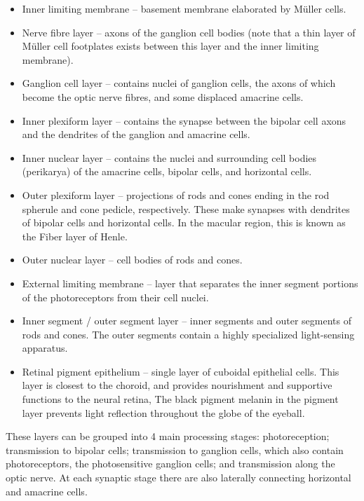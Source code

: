 \documentclass[]{book}
\providecommand{\tightlist}{%
  \setlength{\itemsep}{0pt}\setlength{\parskip}{0pt}}
\begin{document}
\begin{itemize}
\tightlist
\item
  Inner limiting membrane -- basement membrane elaborated by Müller cells.
\item
  Nerve fibre layer -- axons of the ganglion cell bodies (note that a thin layer of Müller cell footplates exists between this layer and the inner limiting membrane).
\item
  Ganglion cell layer -- contains nuclei of ganglion cells, the axons of which become the optic nerve fibres, and some displaced amacrine cells.
\item
  Inner plexiform layer -- contains the synapse between the bipolar cell axons and the dendrites of the ganglion and amacrine cells.
\item
  Inner nuclear layer -- contains the nuclei and surrounding cell bodies (perikarya) of the amacrine cells, bipolar cells, and horizontal cells.
\item
  Outer plexiform layer -- projections of rods and cones ending in the rod spherule and cone pedicle, respectively. These make synapses with dendrites of bipolar cells and horizontal cells. In the macular region, this is known as the Fiber layer of Henle.
\item
  Outer nuclear layer -- cell bodies of rods and cones.
\item
  External limiting membrane -- layer that separates the inner segment portions of the photoreceptors from their cell nuclei.
\item
  Inner segment / outer segment layer -- inner segments and outer segments of rods and cones. The outer segments contain a highly specialized light-sensing apparatus.
\item
  Retinal pigment epithelium -- single layer of cuboidal epithelial cells. This layer is closest to the choroid, and provides nourishment and supportive functions to the neural retina, The black pigment melanin in the pigment layer prevents light reflection throughout the globe of the eyeball.
\end{itemize}

These layers can be grouped into 4 main processing stages: photoreception; transmission to bipolar cells; transmission to ganglion cells, which also contain photoreceptors, the photosensitive ganglion cells; and transmission along the optic nerve. At each synaptic stage there are also laterally connecting horizontal and amacrine cells.
\end{document}
